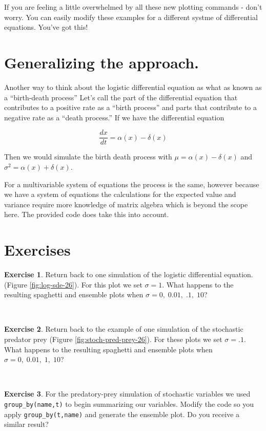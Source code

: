 \documentclass[
]{book}
\theoremstyle{definition}
\theoremstyle{definition}
\theoremstyle{definition}
\newtheorem{exercise}{Exercise}[chapter]
\theoremstyle{remark}
\begin{document}
If you are feeling a little overwhelmed by all these new plotting commands - don't worry. You can easily modify these examples for a different systme of differential equations. You've got this!

\hypertarget{generalizing-the-approach.}{%
\section{Generalizing the approach.}\label{generalizing-the-approach.}}

Another way to think about the logistic differential equation as what as known as a ``birth-death process''
Let's call the part of the differential equation that contributes to a positive rate as a ``birth process'' and parts that contribute to a negative rate as a ``death process.'' If we have the differential equation

\begin{equation*}
\frac{dx}{dt} = \alpha(x)-\delta(x)
\end{equation*}

Then we would simulate the birth death process with \(\mu = \alpha(x)-\delta(x)\) and \(\sigma^{2} = \alpha(x)+\delta(x)\).

For a multivariable system of equations the process is the same, however because we have a system of equations the calculations for the expected value and variance require more knowledge of matrix algebra which is beyond the scope here. The provided code does take this into account.

\newpage

\hypertarget{exercises-12}{%
\section{Exercises}\label{exercises-12}}

\begin{exercise}
\protect\hypertarget{exr:unnamed-chunk-349}{}{\label{exr:unnamed-chunk-349} }Return back to one simulation of the logistic differential equation. (Figure \ref{fig:log-sde-26}). For this plot we set \(\sigma = 1\). What happens to the resulting spaghetti and ensemble plots when \(\sigma =0, \; 0.01, \; .1, \; 10\)?
\end{exercise}
~

\begin{exercise}
\protect\hypertarget{exr:unnamed-chunk-350}{}{\label{exr:unnamed-chunk-350} }Return back to the example of one simulation of the stochastic predator prey (Figure \ref{fig:stoch-pred-prey-26}). For these plots we set \(\sigma = .1\). What happens to the resulting spaghetti and ensemble plots when \(\sigma =0, \; 0.01, \; 1, \; 10\)?
\end{exercise}
~
\begin{exercise}
\protect\hypertarget{exr:unnamed-chunk-351}{}{\label{exr:unnamed-chunk-351} }For the predatory-prey simulation of stochastic variables we used \texttt{group\_by(name,t)} to begin summarizing our variables. Modify the code so you apply \texttt{group\_by(t,name)} and generate the ensemble plot. Do you receive a similar result?
\end{exercise}
~
\end{document}
